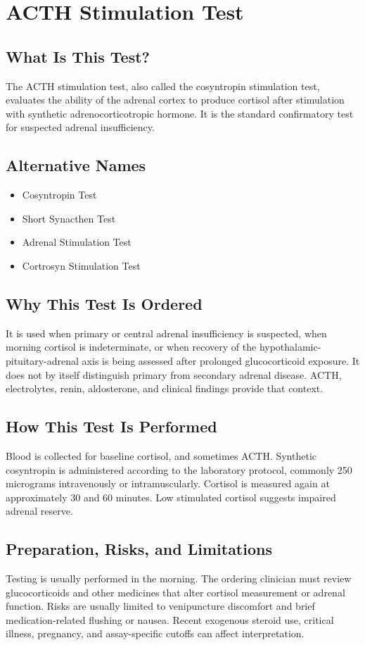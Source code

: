 \chapter{ACTH Stimulation Test}

\section*{What Is This Test?}
The ACTH stimulation test, also called the cosyntropin stimulation test, evaluates the ability of the adrenal cortex to produce cortisol after stimulation with synthetic adrenocorticotropic hormone. It is the standard confirmatory test for suspected adrenal insufficiency.

\section*{Alternative Names}
\begin{itemize}
  \item Cosyntropin Test
  \item Short Synacthen Test
  \item Adrenal Stimulation Test
  \item Cortrosyn Stimulation Test
\end{itemize}
\section*{Why This Test Is Ordered}
It is used when primary or central adrenal insufficiency is suspected, when morning cortisol is indeterminate, or when recovery of the hypothalamic-pituitary-adrenal axis is being assessed after prolonged glucocorticoid exposure. It does not by itself distinguish primary from secondary adrenal disease. ACTH, electrolytes, renin, aldosterone, and clinical findings provide that context.

\section*{How This Test Is Performed}
Blood is collected for baseline cortisol, and sometimes ACTH. Synthetic cosyntropin is administered according to the laboratory protocol, commonly 250 micrograms intravenously or intramuscularly. Cortisol is measured again at approximately 30 and 60 minutes. Low stimulated cortisol suggests impaired adrenal reserve.

\section*{Preparation, Risks, and Limitations}
Testing is usually performed in the morning. The ordering clinician must review glucocorticoids and other medicines that alter cortisol measurement or adrenal function. Risks are usually limited to venipuncture discomfort and brief medication-related flushing or nausea. Recent exogenous steroid use, critical illness, pregnancy, and assay-specific cutoffs can affect interpretation.

